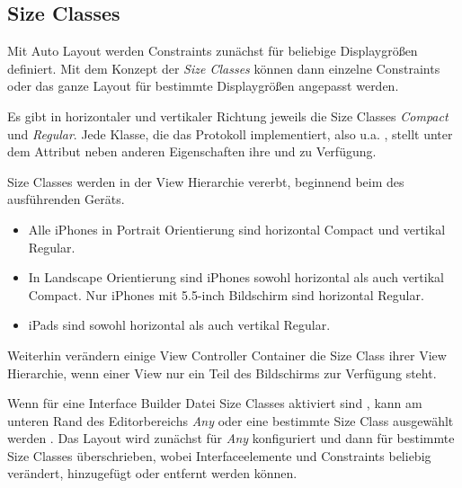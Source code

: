 \documentclass[parskip=half, final]{scrreprt}
\begin{document}
\subsection{Size Classes}

Mit Auto Layout werden Constraints zunächst für beliebige Displaygrößen definiert. Mit dem Konzept der \emph{Size Classes} können dann einzelne Constraints oder das ganze Layout für bestimmte Displaygrößen angepasst werden.

Es gibt in horizontaler und vertikaler Richtung jeweils die Size Classes \emph{Compact} und \emph{Regular}. Jede Klasse, die das  Protokoll implementiert, also u.a. , stellt unter dem Attribut  neben anderen Eigenschaften ihre  und  zu Verfügung. 

Size Classes werden in der View Hierarchie vererbt, beginnend beim  des ausführenden Geräts.

\begin{itemize}
	\item Alle iPhones in Portrait Orientierung sind horizontal Compact und vertikal Regular.
	\item In Landscape Orientierung sind iPhones sowohl horizontal als auch vertikal Compact. Nur iPhones mit 5.5-inch Bildschirm sind horizontal Regular.
	\item iPads sind sowohl horizontal als auch vertikal Regular.
\end{itemize}

Weiterhin verändern einige View Controller Container  die Size Class ihrer View Hierarchie, wenn einer View nur ein Teil des Bildschirms zur Verfügung steht.

Wenn für eine Interface Builder Datei Size Classes aktiviert sind , kann am unteren Rand des Editorbereichs \emph{Any} oder eine bestimmte Size Class ausgewählt werden . Das Layout wird zunächst für \emph{Any} konfiguriert und dann für bestimmte Size Classes überschrieben, wobei Interfaceelemente und Constraints beliebig verändert, hinzugefügt oder entfernt werden können.

\end{document}
